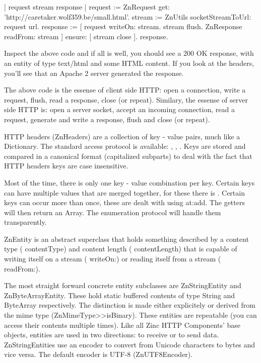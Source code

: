 \documentclass[a4paper,10pt,twoside]{book}
\begin{document}
\begin{code}{}
| request stream response |
request := ZnRequest get: 'http://caretaker.wolf359.be/small.html'.
stream := ZnUtils socketStreamToUrl: request url.
response := [ 
  request writeOn: stream. 
  stream flush. 
  ZnResponse readFrom: stream ] ensure: [ stream close ].
response.
\end{code}

Inspect the above code and if all is well, you should see a 200 OK response, with an entity of type text/html and some HTML content. If you look at the headers, you'll see that an Apache 2 server generated the response.

The above code is the essense of client side HTTP: open a connection, write a request, flush, read a response, close (or repeat). Similary, the essense of server side HTTP is: open a server socket, accept an incoming connection, read a request, generate and write a response, flush and close (or repeat).

HTTP headers (ZnHeaders) are a collection of key - value pairs, much like a Dictionary. The standard access protocol is available: , , . Keys are stored and compared in a canonical format (capitalized subparts) to deal with the fact that HTTP headers keys are case insensitive.

Most of the time, there is only one key - value combination per key. Certain keys can have multiple values that are merged together, for these there is . Certain keys can occur more than once, these are dealt with using  at:add. The getters will then return an Array. The enumeration protocol will handle them transparently.

ZnEntity is an abstract superclass that holds something described by a content type ( contentType) and content length ( contentLength) that is capable of writing itself on a stream ( writeOn:) or reading itself from a stream ( readFrom:).

The most straight forward concrete entity subclasses are ZnStringEntity and ZnByteArrayEntity. These hold static buffered contents of type String and ByteArray respectively. The distinction is made either explicitely or derived from the mime type (ZnMimeType>>isBinary). These entities are repeatable (you can access their contents multiple times). Like all Zinc HTTP Components' base objects, entities are used in two directions: to receive or to send data. ZnStringEntities use an encoder to convert from Unicode characters to bytes and vice versa. The default encoder is UTF-8 (ZnUTF8Encoder).
\end{document}
